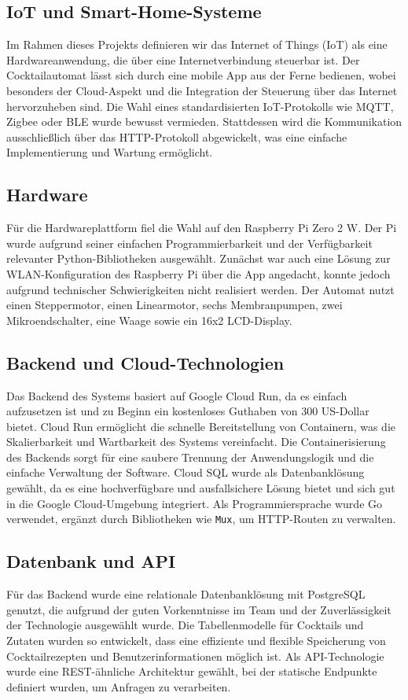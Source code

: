 \subsection{IoT und Smart-Home-Systeme}
Im Rahmen dieses Projekts definieren wir das Internet of Things (IoT) als eine Hardwareanwendung, 
die über eine Internetverbindung steuerbar ist. Der Cocktailautomat lässt sich durch eine mobile 
App aus der Ferne bedienen, wobei besonders der Cloud-Aspekt und die Integration der Steuerung über 
das Internet hervorzuheben sind. Die Wahl eines standardisierten IoT-Protokolls wie MQTT, Zigbee 
oder BLE wurde bewusst vermieden. Stattdessen wird die Kommunikation ausschließlich über das 
HTTP-Protokoll abgewickelt, was eine einfache Implementierung und Wartung ermöglicht.

\subsection{Hardware}
Für die Hardwareplattform fiel die Wahl auf den Raspberry Pi Zero 2 W. Der Pi wurde aufgrund seiner 
einfachen Programmierbarkeit und der Verfügbarkeit relevanter Python-Bibliotheken ausgewählt. 
Zunächst war auch eine Lösung zur WLAN-Konfiguration des Raspberry Pi über die App angedacht, konnte 
jedoch aufgrund technischer Schwierigkeiten nicht realisiert werden. Der Automat nutzt einen 
Steppermotor, einen Linearmotor, sechs Membranpumpen, zwei Mikroendschalter, eine Waage sowie ein 
16x2 LCD-Display.

\subsection{Backend und Cloud-Technologien}
Das Backend des Systems basiert auf Google Cloud Run, da es einfach aufzusetzen ist und zu Beginn 
ein kostenloses Guthaben von 300 US-Dollar bietet. Cloud Run ermöglicht die schnelle Bereitstellung 
von Containern, was die Skalierbarkeit und Wartbarkeit des Systems vereinfacht. Die 
Containerisierung des Backends sorgt für eine saubere Trennung der Anwendungslogik und die einfache 
Verwaltung der Software. Cloud SQL wurde als Datenbanklösung gewählt, da es eine hochverfügbare und 
ausfallsichere Lösung bietet und sich gut in die Google Cloud-Umgebung integriert. Als 
Programmiersprache wurde Go verwendet, ergänzt durch Bibliotheken wie \texttt{Mux}, um HTTP-Routen 
zu verwalten.

\subsection{Datenbank und API}
Für das Backend wurde eine relationale Datenbanklösung mit PostgreSQL genutzt, die aufgrund der 
guten Vorkenntnisse im Team und der Zuverlässigkeit der Technologie ausgewählt wurde. Die 
Tabellenmodelle für Cocktails und Zutaten wurden so entwickelt, dass eine effiziente und flexible 
Speicherung von Cocktailrezepten und Benutzerinformationen möglich ist. Als API-Technologie wurde 
eine REST-ähnliche Architektur gewählt, bei der statische Endpunkte definiert wurden, um Anfragen 
zu verarbeiten.

